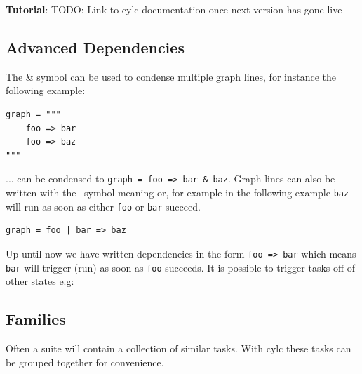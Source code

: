\begin{shaded*}
\textbf{Tutorial}: TODO: Link to cylc documentation once next version has gone live
\end{shaded*}


\subsection{Advanced Dependencies}

The \& symbol can be used to condense multiple graph lines, for instance the
following example:

\begin{lstlisting}
graph = """
    foo => bar
    foo => baz
"""
\end{lstlisting}

... can be condensed to \lstinline{graph = foo => bar & baz}.
Graph lines can also be written with the \textbar \, symbol meaning or, for
example in the following example \lstinline{baz} will run as soon as either
\lstinline{foo} or \lstinline{bar} succeed.

\begin{lstlisting}
graph = foo | bar => baz
\end{lstlisting}

Up until now we have written dependencies in the form \lstinline{foo => bar}
which means \lstinline{bar} will trigger (run) as soon as \lstinline{foo}
succeeds. It is possible to trigger tasks off of other states e.g:



\subsection{Families}
\label{Families}

Often a suite will contain a collection of similar tasks. With cylc these
tasks can be grouped together for convenience.

